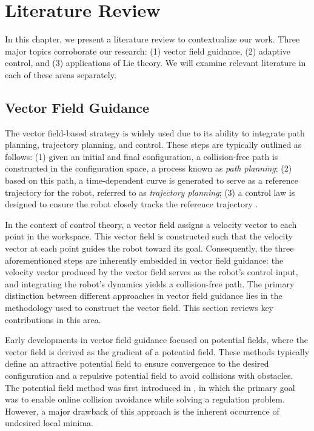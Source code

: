 \chapter{Literature Review} \label{chap:literature-review}
In this chapter, we present a literature review to contextualize our work. Three major topics corroborate our research: (1) vector field guidance, (2) adaptive control, and (3) applications of Lie theory. We will examine relevant literature in each of these areas separately.

\section{Vector Field Guidance} \label{sec:lit-review-vector-field-guidance}
The vector field-based strategy is widely used due to its ability to integrate path planning, trajectory planning, and control. These steps are typically outlined as follows: (1) given an initial and final configuration, a collision-free path is constructed in the configuration space, a process known as \emph{path planning}; (2) based on this path, a time-dependent curve is generated to serve as a reference trajectory for the robot, referred to as \emph{trajectory planning}; (3) a control law is designed to ensure the robot closely tracks the reference trajectory \citep{Rimon1992}.

In the context of control theory, a vector field assigns a velocity vector to each point in the workspace. This vector field is constructed such that the velocity vector at each point guides the robot toward its goal. Consequently, the three aforementioned steps are inherently embedded in vector field guidance: the velocity vector produced by the vector field serves as the robot's control input, and integrating the robot's dynamics yields a collision-free path. The primary distinction between different approaches in vector field guidance lies in the methodology used to construct the vector field. This section reviews key contributions in this area.

Early developments in vector field guidance focused on potential fields, where the vector field is derived as the gradient of a potential field. These methods typically define an attractive potential field to ensure convergence to the desired configuration and a repulsive potential field to avoid collisions with obstacles. The potential field method was first introduced in \citet{Khatib1985}, in which the primary goal was to enable online collision avoidance while solving a regulation problem. However, a major drawback of this approach is the inherent occurrence of undesired local minima.

